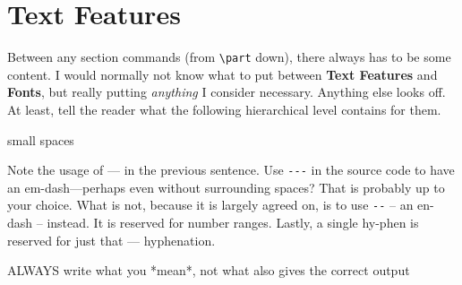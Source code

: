 \section{Text Features}
Between any section commands (from \verb|\part| down), there always has to be some content.
I would normally not know what to put between \textbf{Text Features} and \textbf{Fonts}, but really putting \textit{anything} I consider necessary.
Anything else looks off.
At least, tell the reader what the following hierarchical level contains for them.

small spaces \ 

Note the usage of --- in the previous sentence.
Use \verb|---| in the source code to have an em-dash---perhaps even without surrounding spaces?
That is probably up to your choice.
What is not, because it is largely agreed on, is to use \verb|--| -- an en-dash -- instead.
It is reserved for number ranges.
Lastly, a single hy-phen is reserved for just that --- hyphenation.

ALWAYS write what you *mean*, not what also gives the correct output